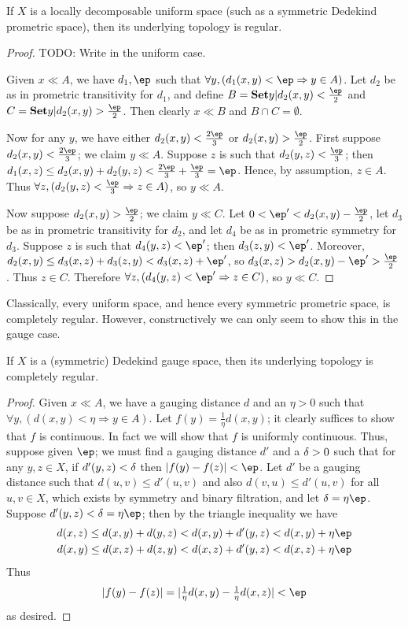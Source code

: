 \documentclass{article}
\let\implies\Rightarrow
\def\hfep{\frac{\ep}{2}}
\begin{document}
\begin{thm}\label{thm:sympmet-reg}
  If $X$ is a locally decomposable uniform space (such as a symmetric Dedekind prometric space), then its underlying topology is regular.
\end{thm}
\begin{proof}
  TODO: Write in the uniform case.
  
  Given $x\ll A$, we have $d_1,\ep$ such that $\forall y, (d_1(x,y)<\ep \implies y\in A)$.
  Let $d_2$ be as in prometric transitivity for $d_1$, and define $B = \setof{y|d_2(x,y)<\hfep}$ and $C = \setof{y|d_2(x,y)>\hfep}$.
  Then clearly $x\ll B$ and $B\cap C = \emptyset$.

  Now for any $y$, we have either $d_2(x,y)<\frac{2\ep}3$ or $d_2(x,y)>\hfep$.
  First suppose $d_2(x,y)<\frac{2\ep}3$; we claim $y\ll A$.
  Suppose $z$ is such that $d_2(y,z)<\frac{\ep}{3}$; then $d_1(x,z) \le d_2(x,y)+d_2(y,z) < \frac{2\ep}{3} + \frac{\ep}{3} = \ep$.
  Hence, by assumption, $z\in A$.
  Thus $\forall z, (d_2(y,z)<\frac{\ep}{3} \implies z\in A)$, so $y\ll A$.

  Now suppose $d_2(x,y)>\hfep$; we claim $y\ll C$.
  Let $0<\ep' < d_2(x,y)-\hfep$, let $d_3$ be as in prometric transitivity for $d_2$, and let $d_4$ be as in prometric symmetry for $d_3$.
  Suppose $z$ is such that $d_4(y,z)<\ep'$; then $d_3(z,y)<\ep'$.
  Moreover, $d_2(x,y) \le d_3(x,z) + d_3(z,y) < d_3(x,z) + \ep'$, so $d_3(x,z) > d_2(x,y) - \ep' > \hfep$.
  Thus $z\in C$.
  Therefore $\forall z, (d_4(y,z)<\ep' \implies z\in C)$, so $y\ll C$.
\end{proof}

Classically, every uniform space, and hence every symmetric prometric space, is completely regular.
However, constructively we can only seem to show this in the gauge case.

\begin{thm}\label{thm:symgauge-creg}
  If $X$ is a (symmetric) Dedekind gauge space, then its underlying topology is completely regular.
\end{thm}
\begin{proof}
  Given $x\ll A$, we have a gauging distance $d$ and an $\eta>0$ such that $\forall y, (d(x,y)<\eta \implies y\in A)$.
  Let $f(y) = \frac1{\eta} d(x,y)$; it clearly suffices to show that $f$ is continuous.
  In fact we will show that $f$ is uniformly continuous.
  Thus, suppose given $\ep$; we must find a gauging distance $d'$ and a $\delta>0$ such that for any $y,z\in X$, if $d'(y,z)<\delta$ then $|f(y)-f(z)|<\ep$.
  Let $d'$ be a gauging distance such that $d(u,v)\le d'(u,v)$ and also $d(v,u) \le d'(u,v)$ for all $u,v\in X$, which exists by symmetry and binary filtration, and let $\de = \eta\ep$.
  Suppose $d'(y,z)< \de= \eta\ep$; then by the triangle inequality we have
  \begin{gather*}
    d(x,z) \le d(x,y)+d(y,z) < d(x,y) + d'(y,z) < d(x,y)+\eta\ep\\
    d(x,y) \le d(x,z)+d(z,y) < d(x,z) + d'(y,z) < d(x,z)+\eta\ep
  \end{gather*}
  Thus
  \[ |f(y)-f(z)| = |\textstyle\frac1{\eta}d(x,y) - \frac1{\eta}d(x,z)| < \ep \]
  as desired.
\end{proof}
\end{document}
